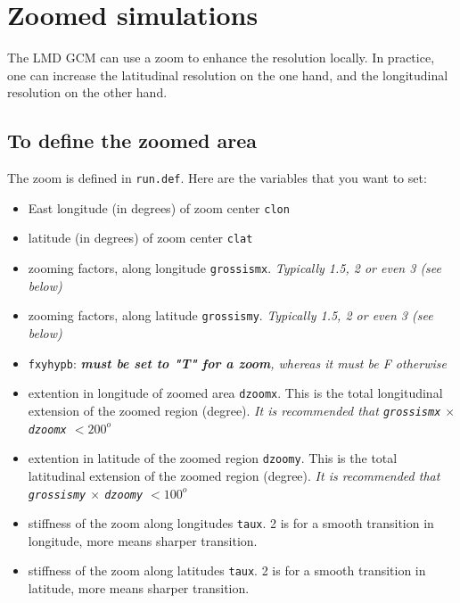 \chapter{Zoomed simulations}

\label{sc:zoom}

The LMD GCM can use a zoom to enhance the resolution locally.
In practice, one can
increase the latitudinal resolution on the one hand,
and the longitudinal resolution on
the other hand. 

\section{To define the zoomed area}

The zoom is defined in {\tt run.def}.
Here are the variables that you want to set:

\begin{itemize}
\item East longitude (in degrees) of zoom center {\tt clon}
\item latitude (in degrees) of zoom center {\tt clat}
\item zooming factors, along longitude {\tt grossismx}.
      {\it Typically 1.5, 2 or even 3 (see below)}
\item zooming factors, along latitude {\tt grossismy}. {\it Typically 1.5, 2
or even 3 (see below)}
\item {\tt fxyhypb}:
      {\it {\bf must be set to "T" for a zoom}, whereas it must be F otherwise}
\item extention in longitude  of zoomed area {\tt dzoomx}.
      This is the total
      longitudinal extension of the zoomed region (degree). \newline
      {\it It is recommended that {\tt grossismx} $\times$
      {\tt dzoomx} $< 200^o$}
\item extention in latitude of the zoomed region {\tt dzoomy}.
      This is the total
      latitudinal extension of the zoomed region (degree). \newline
      {\it It is recommended that {\tt
      grossismy} $\times$ {\tt dzoomy} $< 100^o$}
\item stiffness of the zoom along longitudes {\tt taux}.
      2 is for a smooth transition in
      longitude, more means sharper transition.
\item stiffness of the zoom along latitudes {\tt taux}.
      2 is for a smooth transition in
      latitude, more means sharper transition.
\end{itemize}

